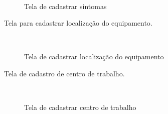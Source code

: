 \begin{figure}[H]
		\caption{\label{Cadastro_Sintomas}Tela de cadastrar sintomas}
	\centering
	\mbox{%
		\qquad
	}
	
\end{figure}
\newpage

Tela para cadastrar localização do equipamento.

\begin{figure}[H]
		\caption{\label{Cadastro_Localizaçao} Tela de cadastrar localização do equipamento}
	\centering
	\mbox{%
		\qquad
	}
	
\end{figure}
\newpage


Tela de cadastro de centro de trabalho.

\begin{figure}[H]
		\caption{\label{Cadastro_Centro_Trabalho} Tela de cadastrar centro de trabalho}
	\centering
	\mbox{%
		\qquad
	}
	
\end{figure}
\newpage


